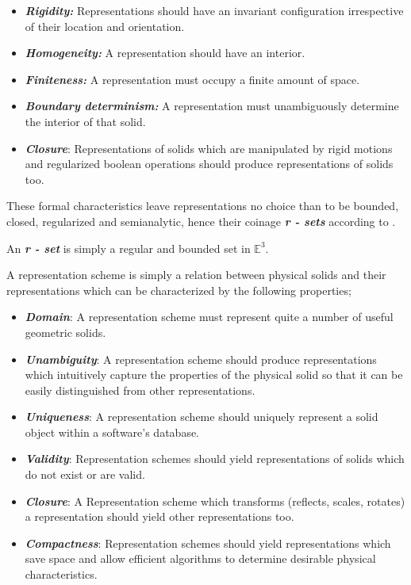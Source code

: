 \begin{itemize}
\item \textit{\textbf{Rigidity:}} Representations should have an invariant configuration
irrespective of their location and orientation.
\item \textit{\textbf{Homogeneity:}} A representation should have an interior.
\item \textit{\textbf{Finiteness:}} A representation must occupy a finite amount of space.
\item \textit{\textbf{Boundary determinism:}} A representation must unambiguously determine
the interior of that solid.
\item \textit{\textbf{Closure}}: Representations of solids which are manipulated by rigid
motions and regularized boolean operations should produce representations of solids too.
\end{itemize}
These formal characteristics leave representations no choice than to be
bounded, closed, regularized and semi­analytic, hence their coinage \textit{\textbf{r - ­sets}}
according to \cite{5}. 
\begin{Def2}
An \textit{\textbf{r - ­set}} is simply a regular and bounded set in $\mathbb{E}^3$.
\end{Def2}
\hspace{30} A representation scheme is simply a relation between physical solids and their representations which can be characterized by the following properties;
\begin{itemize}
\item \textit{\textbf{Domain}}: A representation scheme must represent quite a number of useful geometric solids. 
\item \textit{\textbf{Unambiguity}}: A representation scheme should produce representations which intuitively capture the properties of the physical solid so that it can be easily distinguished from other representations.
\item \textit{\textbf{Uniqueness}}: A representation scheme should uniquely represent a solid object within a software's database.  
\item \textit{\textbf{Validity}}: Representation schemes should yield representations of solids which do not exist or are valid.  
\item \textit{\textbf{Closure}}: A Representation scheme which transforms (reflects, scales, rotates) a representation should yield other representations too.
\item \textit{\textbf{Compactness}}: Representation schemes should yield representations which save space and allow efficient algorithms to   determine desirable physical characteristics.
\end{itemize}
